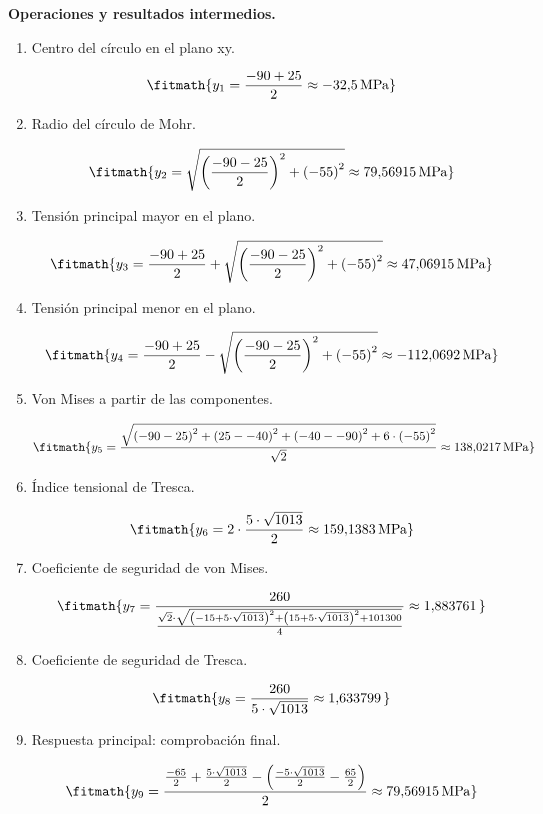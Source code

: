 \noindent\textbf{Operaciones y resultados intermedios.}

\begin{enumerate}

\item Centro del círculo en el plano xy.

\[\fitmath{y_{1}=\frac{-90+25}{2}\approx -32{,}5\,\mathrm{MPa}}\]

\item Radio del círculo de Mohr.

\[\fitmath{y_{2}=\sqrt{{\left(\frac{-90-25}{2}\right)}^{2}+{\left(-55\right)}^{2}}\approx 79{,}56915\,\mathrm{MPa}}\]

\item Tensión principal mayor en el plano.

\[\fitmath{y_{3}=\frac{-90+25}{2}+\sqrt{{\left(\frac{-90-25}{2}\right)}^{2}+{\left(-55\right)}^{2}}\approx 47{,}06915\,\mathrm{MPa}}\]

\item Tensión principal menor en el plano.

\[\fitmath{y_{4}=\frac{-90+25}{2}-\sqrt{{\left(\frac{-90-25}{2}\right)}^{2}+{\left(-55\right)}^{2}}\approx -112{,}0692\,\mathrm{MPa}}\]

\item Von Mises a partir de las componentes.

\[\fitmath{y_{5}=\frac{\sqrt{{\left(-90-25\right)}^{2}+{\left(25--40\right)}^{2}+{\left(-40--90\right)}^{2}+6\cdot {\left(-55\right)}^{2}}}{\sqrt{2}}\approx 138{,}0217\,\mathrm{MPa}}\]

\item Índice tensional de Tresca.

\[\fitmath{y_{6}=2\cdot \frac{5\cdot \sqrt{1013}}{2}\approx 159{,}1383\,\mathrm{MPa}}\]

\item Coeficiente de seguridad de von Mises.

\[\fitmath{y_{7}=\frac{260}{\frac{\sqrt{2}\cdot \sqrt{{\left(-15+5\cdot \sqrt{1013}\right)}^{2}+{\left(15+5\cdot \sqrt{1013}\right)}^{2}+101300}}{4}}\approx 1{,}883761\,}\]

\item Coeficiente de seguridad de Tresca.

\[\fitmath{y_{8}=\frac{260}{5\cdot \sqrt{1013}}\approx 1{,}633799\,}\]

\item Respuesta principal: comprobación final.

\[\fitmath{y_{9}=\frac{\frac{-65}{2}+\frac{5\cdot \sqrt{1013}}{2}-\left(\frac{-5\cdot \sqrt{1013}}{2}-\frac{65}{2}\right)}{2}\approx 79{,}56915\,\mathrm{MPa}}\]

\end{enumerate}
